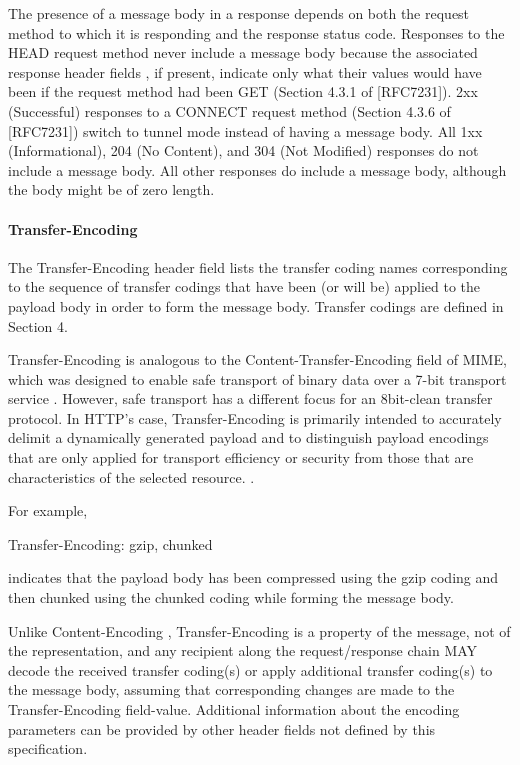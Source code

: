 The presence of a message body in a response depends on both the
request method to which it is responding and the response status code.  
Responses to the HEAD request method 
never include a message body because the associated
response header fields 
, if present, indicate only what their values would have been if
the request method had been GET (Section 4.3.1 of [RFC7231]). 2xx
(Successful) responses to a CONNECT request method (Section 4.3.6 of
[RFC7231]) switch to tunnel mode instead of having a message body.
All 1xx (Informational), 204 (No Content), and 304 (Not Modified)
responses do not include a message body.  All other responses do
include a message body, although the body might be of zero length.

\paragraph*{Transfer-Encoding }

The Transfer-Encoding header field lists the transfer coding names
corresponding to the sequence of transfer codings that have been (or
will be) applied to the payload body in order to form the message
body.  Transfer codings are defined in Section 4.



Transfer-Encoding is analogous to the Content-Transfer-Encoding field
of MIME, which was designed to enable safe transport of binary data
over a 7-bit transport service .  However, safe
transport has a different focus for an 8bit-clean transfer protocol.
In HTTP's case, Transfer-Encoding is primarily intended to accurately
delimit a dynamically generated payload and to distinguish payload
encodings that are only applied for transport efficiency or security
from those that are characteristics of the selected resource.
. 

For example,

  Transfer-Encoding: gzip, chunked

indicates that the payload body has been compressed using the gzip
coding and then chunked using the chunked coding while forming the
message body.

Unlike Content-Encoding ,
Transfer-Encoding is a property of the message, not of the
representation, and any recipient along the request/response chain
MAY decode the received transfer coding(s) or apply additional
transfer coding(s) to the message body, assuming that corresponding
changes are made to the Transfer-Encoding field-value.  Additional
information about the encoding parameters can be provided by other
header fields not defined by this specification.



